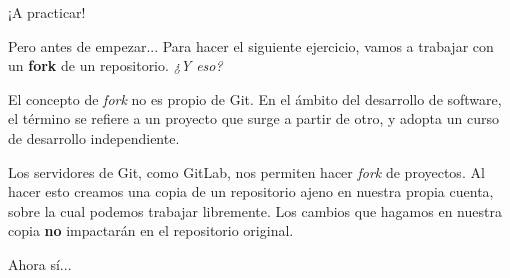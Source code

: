 \begin{frame}[t]{¡A practicar!}

    \pause
    \begin{block}{Pero antes de empezar...}
        Para hacer el siguiente ejercicio, vamos a trabajar con un \textbf{fork} de un repositorio.
        \pause\textit{¿Y eso?}

        \pause
        El concepto de \textit{fork} no es propio de Git. En el ámbito del desarrollo de software,
        el término se refiere a un proyecto que surge a partir de otro, y adopta un curso de
        desarrollo independiente.

        \pause
        Los servidores de Git, como GitLab, nos permiten hacer \textit{fork} de proyectos. Al hacer
        esto creamos una copia de un repositorio ajeno en nuestra propia cuenta, sobre la cual
        podemos trabajar libremente. Los cambios que hagamos en nuestra copia \textbf{no} impactarán
        en el repositorio original.
    \end{block}

    \pause
    \begin{center}
    \Large Ahora sí...
    \end{center}
\end{frame}


